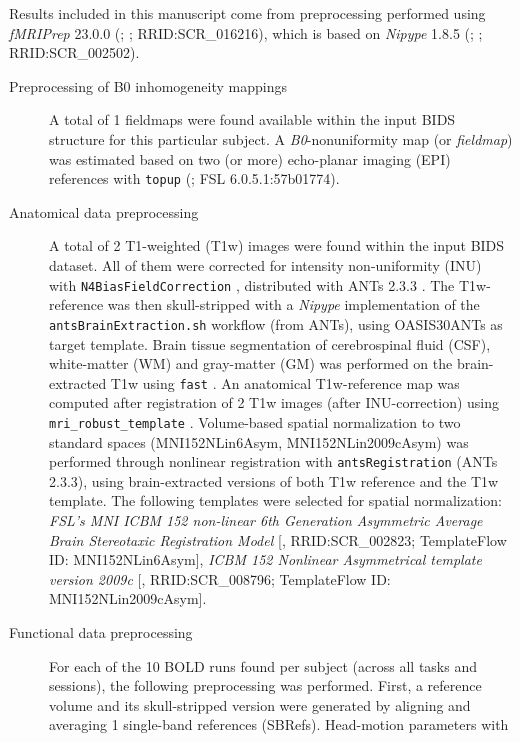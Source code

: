 \documentclass[
]{article}
\author{}
\date{}
\begin{document}
Results included in this manuscript come from preprocessing performed
using \emph{fMRIPrep} 23.0.0 (\citet{fmriprep1}; \citet{fmriprep2};
RRID:SCR\_016216), which is based on \emph{Nipype} 1.8.5
(\citet{nipype1}; \citet{nipype2}; RRID:SCR\_002502).

\begin{description}
\item[Preprocessing of B0 inhomogeneity mappings]
A total of 1 fieldmaps were found available within the input BIDS
structure for this particular subject. A \emph{B0}-nonuniformity map (or
\emph{fieldmap}) was estimated based on two (or more) echo-planar
imaging (EPI) references with \texttt{topup} (\citet{topup}; FSL
6.0.5.1:57b01774).
\item[Anatomical data preprocessing]
A total of 2 T1-weighted (T1w) images were found within the input BIDS
dataset. All of them were corrected for intensity non-uniformity (INU)
with \texttt{N4BiasFieldCorrection} \citep{n4}, distributed with ANTs
2.3.3 \citep[RRID:SCR\_004757]{ants}. The T1w-reference was then
skull-stripped with a \emph{Nipype} implementation of the
\texttt{antsBrainExtraction.sh} workflow (from ANTs), using OASIS30ANTs
as target template. Brain tissue segmentation of cerebrospinal fluid
(CSF), white-matter (WM) and gray-matter (GM) was performed on the
brain-extracted T1w using \texttt{fast} \citep[FSL 6.0.5.1:57b01774,
RRID:SCR\_002823,][]{fsl_fast}. An anatomical T1w-reference map was
computed after registration of 2 T1w images (after INU-correction) using
\texttt{mri\_robust\_template} \citep[FreeSurfer 7.3.2,][]{fs_template}.
Volume-based spatial normalization to two standard spaces
(MNI152NLin6Asym, MNI152NLin2009cAsym) was performed through nonlinear
registration with \texttt{antsRegistration} (ANTs 2.3.3), using
brain-extracted versions of both T1w reference and the T1w template. The
following templates were selected for spatial normalization: \emph{FSL's
MNI ICBM 152 non-linear 6th Generation Asymmetric Average Brain
Stereotaxic Registration Model} {[}\citet{mni152nlin6asym},
RRID:SCR\_002823; TemplateFlow ID: MNI152NLin6Asym{]}, \emph{ICBM 152
Nonlinear Asymmetrical template version 2009c}
{[}\citet{mni152nlin2009casym}, RRID:SCR\_008796; TemplateFlow ID:
MNI152NLin2009cAsym{]}.
\item[Functional data preprocessing]
For each of the 10 BOLD runs found per subject (across all tasks and
sessions), the following preprocessing was performed. First, a reference
volume and its skull-stripped version were generated by aligning and
averaging 1 single-band references (SBRefs). Head-motion parameters with

\end{description}
\end{document}
